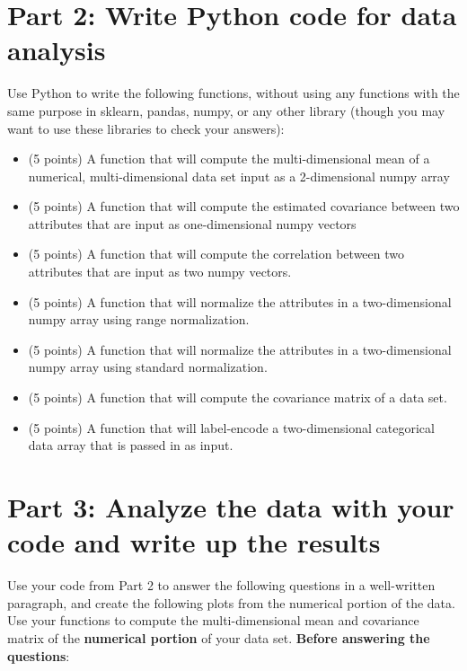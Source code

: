 \documentclass[11pt]{article}
\begin{document}
\section*{Part 2: Write Python code for data analysis}

Use Python to write the following functions, without using any functions with
the same purpose in sklearn, pandas, numpy, or any other library (though you may
want to use these libraries to check your answers):

\begin{itemize}

    \item (5 points) A function that will compute the multi-dimensional mean of
    a numerical, multi-dimensional data set input as a 2-dimensional numpy array

    \item (5 points) A function that will compute the estimated covariance
    between two attributes that are input as one-dimensional numpy vectors

    \item (5 points) A function that will compute the correlation between two
    attributes that are input as two numpy vectors.

    \item (5 points) A function that will normalize the attributes in a
    two-dimensional numpy array using range normalization.

    \item (5 points) A function that will normalize the attributes in a
    two-dimensional numpy array using standard normalization.

    \item (5 points) A function that will compute the covariance matrix of a
    data set.

    \item (5 points) A function that will label-encode a two-dimensional
    categorical data array that is passed in as input.

\end{itemize}

\section*{Part 3: Analyze the data with your code and write up the results}

Use your code from Part 2 to answer the following questions in a well-written
paragraph, and create the following plots from the numerical portion of the
data. Use your functions to compute the multi-dimensional mean and covariance matrix
of the \textbf{numerical portion} of your data set. \textbf{Before answering the
questions}:
\end{document}
